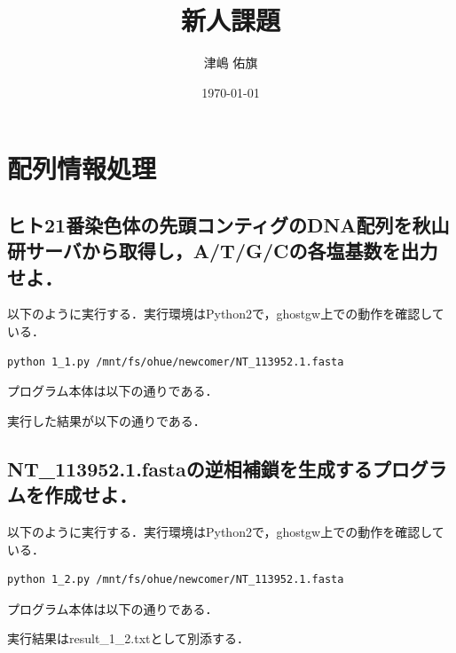 \documentclass[uplatex,a4j]{jsarticle}
\title{新人課題}
\author{津嶋 佑旗}
\date{\today}
\begin{document}
  \maketitle
  \section{配列情報処理}
  \subsection{ヒト21番染色体の先頭コンティグのDNA配列を秋山研サーバから取得し，A/T/G/Cの各塩基数を出力せよ．}
  以下のように実行する．実行環境はPython2で，ghostgw上での動作を確認している．
  \begin{lstlisting}[caption=実行方法, label=run1]
    python 1_1.py /mnt/fs/ohue/newcomer/NT_113952.1.fasta
  \end{lstlisting}
  プログラム本体は以下の通りである．
  
  実行した結果が以下の通りである．
  
  
  \subsection{NT\_113952.1.fastaの逆相補鎖を生成するプログラムを作成せよ．}
  以下のように実行する．実行環境はPython2で，ghostgw上での動作を確認している．
  \begin{lstlisting}[caption=実行方法, label=run2]
    python 1_2.py /mnt/fs/ohue/newcomer/NT_113952.1.fasta
  \end{lstlisting}
  プログラム本体は以下の通りである．
  
  
  
  実行結果はresult\_1\_2.txtとして別添する．
  
\end{document}
